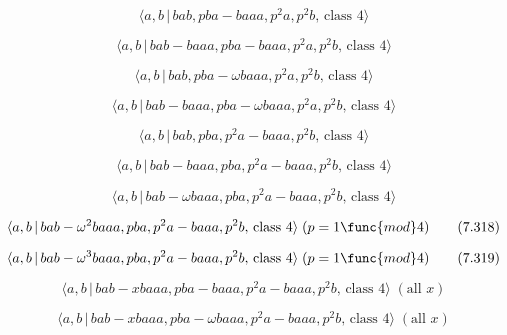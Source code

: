 \documentclass[10pt]{article}
\begin{document}
\begin{equation}
\langle a,b\,|\,bab,pba-baaa,p^2a,p^2b,\,\text{class }4\rangle  \tag{7.311}
\end{equation}

\begin{equation}
\langle a,b\,|\,bab-baaa,pba-baaa,p^2a,p^2b,\,\text{class }4\rangle 
\tag{7.312}
\end{equation}

\begin{equation}
\langle a,b\,|\,bab,pba-\omega baaa,p^{2}a,p^{2}b,\,\text{class }4\rangle 
\tag{7.313}
\end{equation}

\begin{equation}
\langle a,b\,|\,bab-baaa,pba-\omega baaa,p^{2}a,p^{2}b,\,\text{class }%
4\rangle  \tag{7.314}
\end{equation}

\begin{equation}
\langle a,b\,|\,bab,pba,p^2a-baaa,p^2b,\,\text{class }4\rangle  \tag{7.315}
\end{equation}

\begin{equation}
\langle a,b\,|\,bab-baaa,pba,p^2a-baaa,p^2b,\,\text{class }4\rangle 
\tag{7.316}
\end{equation}

\begin{equation}
\langle a,b\,|\,bab-\omega baaa,pba,p^{2}a-baaa,p^{2}b,\,\text{class }%
4\rangle  \tag{7.317}
\end{equation}

\begin{equation}
\langle a,b\,|\,bab-\omega ^{2}baaa,pba,p^{2}a-baaa,p^{2}b,\,\text{class }%
4\rangle \;(p=1\func{mod}4)  \tag{7.318}
\end{equation}

\begin{equation}
\langle a,b\,|\,bab-\omega ^{3}baaa,pba,p^{2}a-baaa,p^{2}b,\,\text{class }%
4\rangle \;(p=1\func{mod}4)  \tag{7.319}
\end{equation}

\begin{equation}
\langle a,b\,|\,bab-xbaaa,pba-baaa,p^2a-baaa,p^2b,\,\text{class }4\rangle \;(%
\text{all }x)  \tag{7.320}
\end{equation}

\begin{equation}
\langle a,b\,|\,bab-xbaaa,pba-\omega baaa,p^{2}a-baaa,p^{2}b,\,\text{class }%
4\rangle \;(\text{all }x)  \tag{7.321}
\end{equation}
\end{document}

